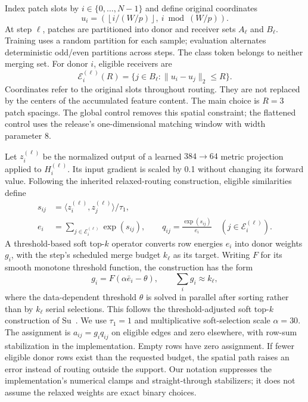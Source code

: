 Index patch slots by $i\in\{0,\ldots,N-1\}$ and define original coordinates
\begin{equation}
 u_i=\left(\left\lfloor i/(W/p)\right\rfloor,\ i\bmod(W/p)\right).
\end{equation}
At step $\ell$, patches are partitioned into donor and receiver sets
$A_\ell$ and $B_\ell$. Training uses a random partition for each sample;
evaluation alternates deterministic odd/even partitions across steps. The
class token belongs to neither merging set. For donor $i$, eligible receivers
are
\begin{equation}
 \mathcal E_i^{(\ell)}(R)=
 \{j\in B_\ell:\|u_i-u_j\|_2\leq R\}.
 \label{eq:support}
\end{equation}
Coordinates refer to the original slots throughout routing. They are not
replaced by the centers of the accumulated feature content. The main choice
is $R=3$ patch spacings. The global control removes this spatial constraint;
the flattened control uses the release's one-dimensional matching window
with width parameter 8.

Let $z_i^{(\ell)}$ be the normalized output of a learned $384\to64$ metric
projection applied to $H_i^{(\ell)}$. Its input gradient is scaled by 0.1
without changing its forward value. Following the inherited relaxed-routing
construction, eligible similarities define
\begin{align}
 s_{ij}&=\langle z_i^{(\ell)},z_j^{(\ell)}\rangle/\tau_1,\\
 e_i&=\sum_{j\in\mathcal E_i^{(\ell)}}\exp(s_{ij}),
 \qquad
 q_{ij}=\frac{\exp(s_{ij})}{e_i}
 \quad (j\in\mathcal E_i^{(\ell)}).
\end{align}
A threshold-based soft top-$k$ operator converts row energies $e_i$ into donor
weights $g_i$, with the step's scheduled merge budget $k_\ell$ as its target.
Writing $F$ for its smooth monotone threshold function, the construction has
the form
\begin{equation}
 g_i=F(\alpha\bar e_i-\theta),\qquad
 \sum_i g_i\approx k_\ell,
 \label{eq:softtopk}
\end{equation}
where the data-dependent threshold $\theta$ is solved in parallel after
sorting rather than by $k_\ell$ serial selections. This follows the
threshold-adjusted soft top-$k$ construction of Su~\cite{sujianlin2024topk}.
We use $\tau_1=1$ and multiplicative soft-selection scale $\alpha=30$. The
assignment is $a_{ij}=g_iq_{ij}$ on eligible edges and zero elsewhere, with
row-sum stabilization in the implementation. Empty rows have zero assignment.
If fewer eligible donor rows exist than the requested budget, the spatial
path raises an error instead of routing outside the support. Our notation
suppresses the implementation's numerical clamps and straight-through
stabilizers; it does not assume the relaxed weights are exact binary choices.

